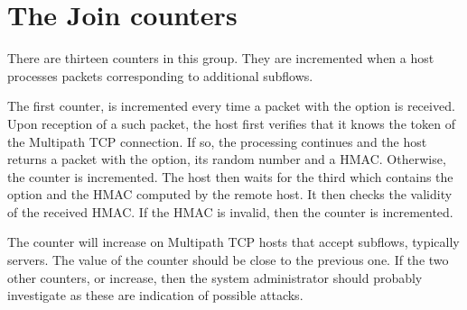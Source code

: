 \documentclass[letterpaper,10pt,english]{sphinxmanual}
\begin{document}
\section{The Join counters}
\label{\detokenize{nstat-mptcp:the-join-counters}}
\sphinxAtStartPar
There are thirteen counters in this group. They are incremented when a host
processes  packets corresponding to additional subflows.

\sphinxAtStartPar
The first counter,  is incremented every time a
 packet with the  option is received. Upon reception
of a such packet, the host first verifies that it knows the token of
the Multipath TCP connection. If so, the processing continues and
the host returns a  packet with the  option, its
random number and a HMAC. Otherwise, the 
counter is incremented. The host then waits for the third 
which contains the  option and the HMAC computed by
the remote host. It then checks the validity of the received HMAC. If
the HMAC is invalid, then the  counter
is incremented.

\sphinxAtStartPar
The  counter will increase on Multipath TCP hosts
that accept subflows, typically servers. The value of the
 counter should be close to the previous one.
If the two other counters,  or
 increase, then the system administrator
should probably investigate as these are indication of possible attacks.
\def\sphinxLiteralBlockLabel{\label{\detokenize{nstat-mptcp:id8}}}
\begin{sphinxVerbatim}[commandchars=\\\{\}]
\end{sphinxVerbatim}
\end{document}
